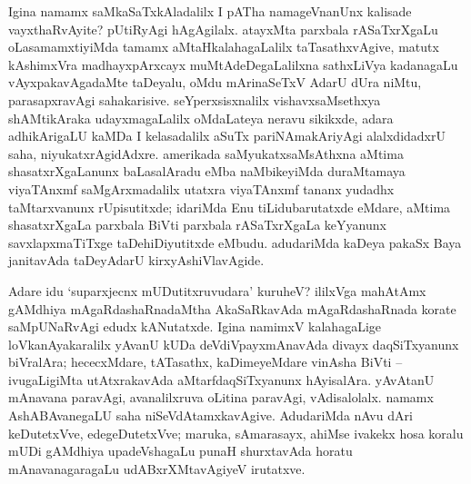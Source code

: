 \newpage

Igina namamx saMkaSaTxkAladalilx I pATha namageVnanUnx kalisade vayxthaRvAyite? pUtiRyAgi hAgAgilalx. atayxMta parxbala rASaTxrXgaLu oLasamamxtiyiMda tamamx aMtaHkalaha\-gaLalilx taTasathxvAgive, matutx kAshimxVra madhayxpArxcayx muMtAdeDegaLalilxna sathxLiVya kadanagaLu vAyxpakavAgadaMte taDeyalu, oMdu mArinaSeTxV AdarU dUra niMtu, parasapxravAgi sahakarisive. seYperxsisxnalilx vishavxsaMsethxya shAMtikAraka udayxmagaLalilx oMdaLateya neravu sikikxde, adara adhikArigaLU kaMDa I kelasadalilx aSuTx pariNAmakAriyAgi alalxdidadxrU saha, niyukatxrAgidAdxre. amerikada saMyukatxsaMsAthxna aMtima shasatxrXgaLanunx baLasalAradu eMba naMbikeyiMda duraMtamaya viyaTAnxmf saMgArxmadalilx utatxra viyaTAnxmf tananx yudadhx taMtarxvanunx rUpisutitxde; idariMda Enu tiLidubarutatxde eMdare, aMtima shasatxrXgaLa parxbala BiVti parxbala rASaTxrXgaLa keYyanunx savxlapxmaTiTxge taDehiDiyutitxde eMbudu. adudariMda kaDeya pakaSx Baya janitavAda taDeyAdarU kirxyAshiVlavAgide. 

Adare idu `suparxjecnx mUDutitxruvudara' kuruheV? ililxVga mahAtAmx gAMdhiya mAgaRdashaRnadaMtha AkaSaRkavAda mAgaRdashaRnada korate saMpUNaRvAgi edudx kANutatxde. Igina namimxV kalahagaLige loVkanAyakaralilx yAvanU kUDa deVdiVpayxmAnavAda divayx daqSiTxyanunx biVralAra; hececxMdare, tATasathx, kaDimeyeMdare vinAsha BiVti -- ivugaLigiMta utAtxrakavAda aMtarfdaqSiTxyanunx hAyisalAra. yAvAtanU mAnavana paravAgi, avanalilxruva oLitina paravAgi, vAdisalolalx. namamx AshABAvanegaLU saha niSeVdAtamxkavAgive. AdudariMda nAvu dAri keDutetxVve, edegeDutetxVve; maruka, sAmarasayx, ahiMse ivakekx hosa koralu mUDi gAMdhiya upadeVshagaLu punaH shurxtavAda horatu mAnavanagaragaLu udABxrXMtavAgiyeV irutatxve.



